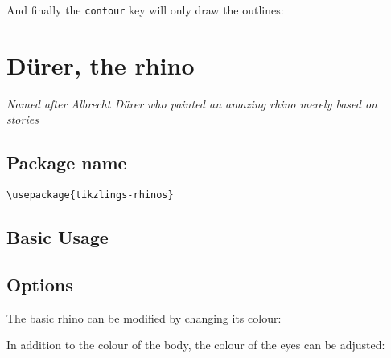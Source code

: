 \documentclass[parskip=half]{scrartcl}
\begin{document}
And finally the \lstinline|contour| key will only draw the outlines:
\begin{tcblisting}{}
\pig[contour=black]
\end{tcblisting}

%
%
\clearpage
\section[Rhino]{D\"urer, the rhino}

\emph{Named after Albrecht D\"urer who painted an amazing rhino merely based on stories}

\subsection{Package name}

\begin{tcolorbox}[lower separated=false, lefthand width=.8\linewidth]
\vspace*{0.5cm}
\lstinline|\usepackage{tikzlings-rhinos}| 
\vspace*{0.5cm}
\end{tcolorbox}

\subsection{Basic Usage}

\begin{tcblisting}{}
\rhino
\end{tcblisting}

\subsection{Options}

The basic rhino can be modified by changing its colour:
\begin{tcblisting}{}
\rhino[body=blue]
\end{tcblisting}

In addition to the colour of the body, the colour of the eyes can be adjusted:
\begin{tcblisting}{}
\rhino[eye=red]
\end{tcblisting}
\begin{tcblisting}{}
\rhino[pupil=red]
\end{tcblisting}
\end{document}
